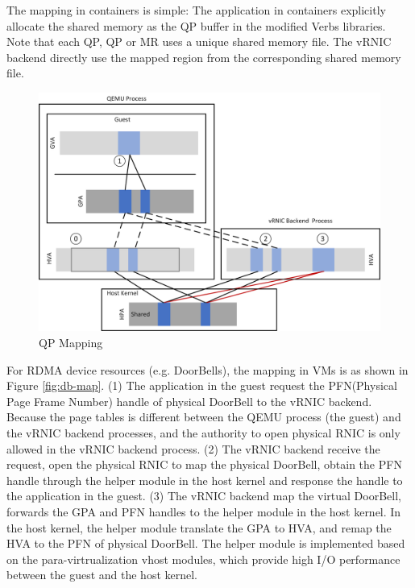  The mapping in containers is simple: The application in containers explicitly allocate the shared memory as the QP buffer in the modified Verbs libraries. Note that each QP, QP or MR uses a unique shared memory file. The vRNIC backend directly use the mapped region from the corresponding shared memory file.
\begin{figure}[!ht]
	\centering
	\includegraphics[width=1\linewidth]{images/qp-map.png}
	\caption{QP Mapping}
	\label{fig:qp-map}
\end{figure}

 

 For RDMA device resources (e.g. DoorBells), the mapping in VMs is as shown in  Figure \ref{fig:db-map}. (1) The application in the guest request the PFN(Physical Page Frame Number) handle of physical DoorBell to the vRNIC backend. Because the page tables is different between the QEMU process (the guest) and the vRNIC backend processes, and the authority to open physical RNIC is only allowed in the vRNIC backend process. (2) The vRNIC backend receive the request, open the physical RNIC to map the physical DoorBell, obtain the PFN handle through the helper module in the host kernel and response the handle to the application in the guest. (3) The vRNIC backend map the virtual DoorBell, forwards the GPA and PFN handles to the helper module in the host kernel. In the host kernel, the helper module translate the GPA to HVA, and remap the HVA to the PFN of physical DoorBell. The helper module is implemented based on the para-virtrualization vhost modules, which provide high I/O performance  between the guest and the host kernel.
 
